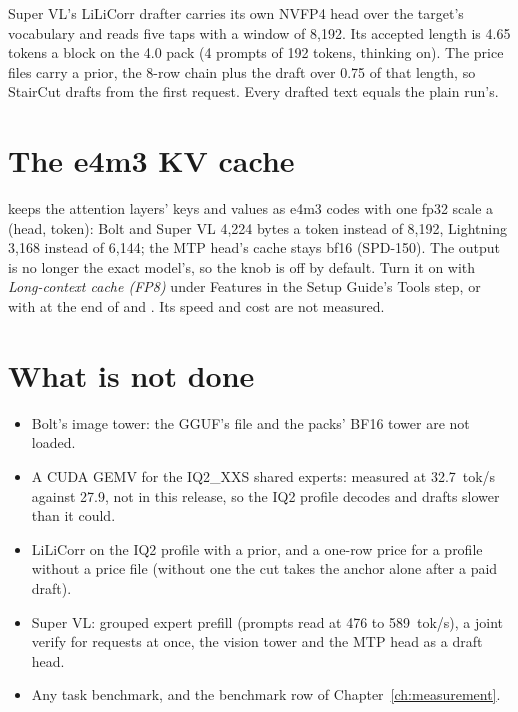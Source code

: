 Super VL's LiLiCorr drafter carries its own NVFP4 head over the target's vocabulary and reads five taps with a window of 8,192. Its accepted length is 4.65 tokens a block on the 4.0 pack (4 prompts of 192 tokens, thinking on). The price files carry a  prior, the 8-row chain plus the draft over 0.75 of that length, so StairCut drafts from the first request. Every drafted text equals the plain run's.

\section{The e4m3 KV cache}

 keeps the attention layers' keys and values as e4m3 codes with one fp32 scale a (head, token): Bolt and Super VL 4,224 bytes a token instead of 8,192, Lightning 3,168 instead of 6,144; the MTP head's cache stays bf16 (SPD-150). The output is no longer the exact model's, so the knob is off by default. Turn it on with \emph{Long-context cache (FP8)} under Features in the Setup Guide's Tools step, or with  at the end of  and . Its speed and cost are not measured.

\section{What is not done}

\begin{itemize}
\item Bolt's image tower: the GGUF's  file and the packs' BF16 tower are not loaded.
\item A CUDA GEMV for the IQ2\_XXS shared experts: measured at 32.7~tok/s against 27.9, not in this release, so the IQ2 profile decodes and drafts slower than it could.
\item LiLiCorr on the IQ2 profile with a  prior, and a one-row price for a profile without a price file (without one the cut takes the anchor alone after a paid draft).
\item Super VL: grouped expert prefill (prompts read at 476 to 589~tok/s), a joint verify for requests at once, the vision tower and the MTP head as a draft head.
\item Any task benchmark, and the benchmark row of Chapter~\ref{ch:measurement}.
\end{itemize}
